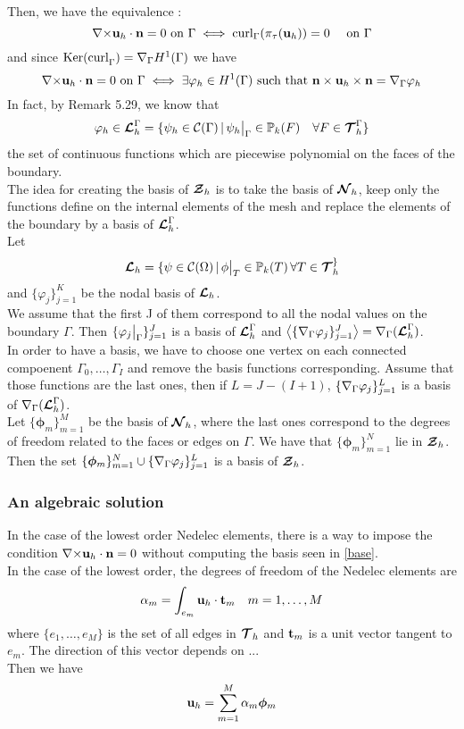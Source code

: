 Then, we have the equivalence :
\[ {\nabla\times}{\mathbf{u}}_h\cdot{\mathbf{n}}=0\mbox{ on }\Gamma \iff
\mathrm{curl}_\Gamma(\pi_\tau({\mathbf{u}}_h))=0\quad \mbox{ on } \Gamma \]
and since $\mathrm{Ker(curl}_\Gamma)={\nabla}_\Gamma H^1(\Gamma)$ we have 
\[ {\nabla\times}{\mathbf{u}}_h\cdot{\mathbf{n}}=0\mbox{ on }\Gamma \iff
\exists\varphi_h\in H^1(\Gamma) \mbox{ such that
}{\mathbf{n}}\times{\mathbf{u}}_h\times{\mathbf{n}} = {\nabla}_\Gamma\varphi_h \]
In fact, by \cite{Monk2003} Remark 5.29, we know that 
\[\varphi_h\in{\bm{\mathcal{L}}}_h^\Gamma = \{\psi_h\in\mathcal{C}(\Gamma) \,|\,
\psi_h{\big\rvert_{\Gamma}}\in{\mathbb{P}}_k(F) \quad \forall F\in{\bm{\mathcal{T}}}_h^\Gamma \}\]
the set of continuous functions which are piecewise polynomial on the faces of
the boundary.\\

The idea for creating the basis of ${\bm{\mathcal{Z}}}_h$ is to take the basis of ${\bm{\mathcal{N}}}_h$, keep
only the functions define on the internal elements of the mesh and replace the
elements of the boundary by a basis of ${\bm{\mathcal{L}}}_h^\Gamma$.\\

Let \[ {\bm{\mathcal{L}}}_h=\{\psi\in\mathcal{C}(\Omega) \,|\,
\phi{\big\rvert_{T}}\in{\mathbb{P}}_k(T)\,\forall T\in{\bm{\mathcal{T}}}_h^\} \]
and $\{\varphi_j\}_{j=1}^K$ be the nodal basis of ${\bm{\mathcal{L}}}_h$.\\
We assume that the first J of them correspond to all the nodal values on the
boundary $\Gamma$. Then $\{\varphi_j{\big\rvert_{\Gamma}}\}_{j=1}^J$ is a
basis of ${\bm{\mathcal{L}}}_h^\Gamma$ and
$\left\langle\{{\nabla}_\Gamma\varphi_j\}_{j=1}^J\right\rangle={\nabla}_\Gamma({\bm{\mathcal{L}}}_h^\Gamma)$.\\
In order to have a basis, we have to choose one vertex on each connected
compoenent $\Gamma_0,\dots,\Gamma_I$ and remove the basis functions
corresponding. Assume that those functions are the last ones, then if
$L=J-(I+1)$, $\{{\nabla}_\Gamma\varphi_j\}_{j=1}^L$ is a basis of
${\nabla}_\Gamma({\bm{\mathcal{L}}}_h^\Gamma)$.\\
Let $\{\bm{\phi}_m\}_{m=1}^M$ be the basis of ${\bm{\mathcal{N}}}_h$, where the last ones
correspond to the degrees of freedom related to the faces or edges on
$\Gamma$. We have that $\{\bm{\phi}_m\}_{m=1}^N$ lie in ${\bm{\mathcal{Z}}}_h$.\\

Then the set $\{\bm{\phi}_m\}_{m=1}^N\cup  \{{\nabla}_\Gamma\varphi_j\}_{j=1}^L$
is a basis of ${\bm{\mathcal{Z}}}_h$.

\subsubsection{An algebraic solution}
In the case of the lowest order Nedelec elements, there is a way to impose the
condition ${\nabla\times}{\mathbf{u}}_h\cdot{\mathbf{n}}=0$ without computing the basis seen in
  \ref{base}.\\
In the case of the lowest order, the degrees of freedom of the Nedelec elements
are \[\alpha_m=\int_{e_m} {\mathbf{u}}_h\cdot{\mathbf{t}}_m \quad m=1,\dots,M\] where $\{e_1,\dots,e_M\}$ is the set
of all edges in ${\bm{\mathcal{T}}}_h$ and ${\mathbf{t}}_m$ is a unit vector tangent to $e_m$. The
direction of this vector depends on ...\\
Then we have \[{\mathbf{u}}_h = \sum_{m=1}^M \alpha_m\bm{\phi}_m\]

